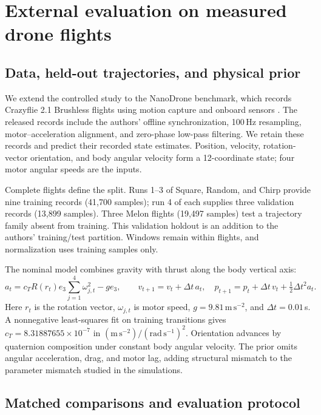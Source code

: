 \section{External evaluation on measured drone flights}
\label{sec:external}

\subsection{Data, held-out trajectories, and physical prior}

We extend the controlled study to the NanoDrone benchmark, which records
Crazyflie 2.1 Brushless flights using motion capture and onboard sensors
\cite{busetto2026_nanodrone}. The released records include the authors'
offline synchronization, 100\,Hz resampling, motor--acceleration alignment,
and zero-phase low-pass filtering. We retain these records and predict their
recorded state estimates. Position, velocity, rotation-vector orientation,
and body angular velocity form a 12-coordinate state; four motor angular
speeds are the inputs.

Complete flights define the split. Runs 1--3 of Square, Random, and Chirp
provide nine training records (41,700 samples); run 4 of each supplies three
validation records (13,899 samples). Three Melon flights (19,497 samples)
test a trajectory family absent from training. This validation holdout is an
addition to the authors' training/test partition. Windows remain within
flights, and normalization uses training samples only.

The nominal model combines gravity with thrust along the body vertical axis:
\begin{equation}
 a_t=c_T R(r_t)e_3\sum_{j=1}^{4}\omega_{j,t}^{2}-g e_3,
 \qquad
 v_{t+1}=v_t+\Delta t\,a_t,\quad
 p_{t+1}=p_t+\Delta t\,v_t+\tfrac12\Delta t^2a_t.
 \label{eq:flight-prior}
\end{equation}
Here $r_t$ is the rotation vector, $\omega_{j,t}$ is motor speed,
$g=9.81\,\mathrm{m\,s^{-2}}$, and $\Delta t=0.01$\,s. A nonnegative
least-squares fit on training transitions gives
$c_T=8.31887655\times10^{-7}$ in
$(\mathrm{m\,s^{-2}})/(\mathrm{rad\,s^{-1}})^2$.
Orientation advances by quaternion composition under constant body angular
velocity. The prior omits angular acceleration, drag, and motor lag, adding
structural mismatch to the parameter mismatch studied in the simulations.

\subsection{Matched comparisons and evaluation protocol}

